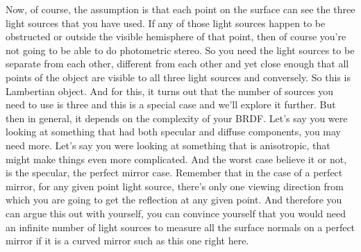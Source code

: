 \documentclass[12pt]{article}
\begin{document}
Now, of course, the assumption is
that each point on the surface can see the three light sources
that you have used.
If any of those light sources happen
to be obstructed or outside the visible hemisphere
of that point, then of course you're
not going to be able to do photometric stereo.
So you need the light sources to be separate from each other,
different from each other and yet close enough
that all points of the object are visible to all three
light sources and conversely.
So this is Lambertian object.
And for this, it turns out that the number of sources
you need to use is three and this is a special case
and we'll explore it further.
But then in general, it depends on the complexity of your BRDF.
Let's say you were looking at something
that had both specular and diffuse components,
you may need more.
Let's say you were looking at something
that is anisotropic, that might make things even more
complicated.
And the worst case believe it or not,
is the specular, the perfect mirror case.
Remember that in the case of a perfect mirror,
for any given point light source,
there's only one viewing direction from which you
are going to get the reflection at any given point.
And therefore you can argue this out with yourself,
you can convince yourself that you
would need an infinite number of light sources
to measure all the surface normals on a perfect mirror
if it is a curved mirror such as this one right here.
\end{document}

